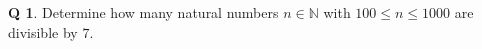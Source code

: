 \documentclass[12pt]{article}
\newcommand{\set}[1]{\left\{\,#1\,\right\}}
\theoremstyle{definition}
\newtheorem{qn}{Q}
\numberwithin{equation}{qn}
\newcommand{\nat}{\mathbb{N}}
\begin{document}
\begin{qn}
    Determine how many natural numbers $n\in\nat$ with $100\leq n\leq1000$ are divisible by $7$.
\end{qn}
\end{document}

